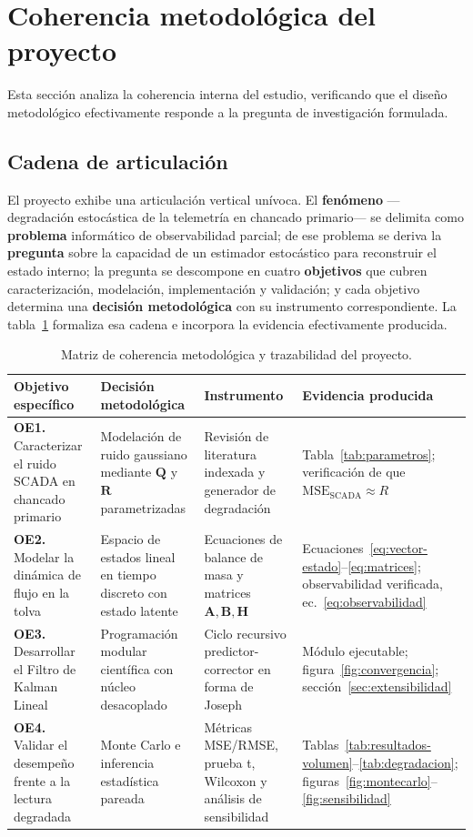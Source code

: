 \section{Coherencia metodológica del proyecto}
\label{sec:coherencia}

Esta sección analiza la coherencia interna del estudio, verificando que el
diseño metodológico efectivamente responde a la pregunta de investigación
formulada.

\subsection{Cadena de articulación}

El proyecto exhibe una articulación vertical unívoca. El \textbf{fenómeno}
—degradación estocástica de la telemetría en chancado primario— se delimita como
\textbf{problema} informático de observabilidad parcial; de ese problema se
deriva la \textbf{pregunta} sobre la capacidad de un estimador estocástico para
reconstruir el estado interno; la pregunta se descompone en cuatro
\textbf{objetivos} que cubren caracterización, modelación, implementación y
validación; y cada objetivo determina una \textbf{decisión metodológica} con su
instrumento correspondiente. La tabla~\ref{tab:coherencia} formaliza esa cadena
e incorpora la evidencia efectivamente producida.

\begin{table}[H]
\centering
\caption{Matriz de coherencia metodológica y trazabilidad del proyecto.}
\label{tab:coherencia}
\footnotesize
\begin{tabular}{@{}p{2.9cm}p{3.2cm}p{3.2cm}p{3.9cm}@{}}
\toprule
\textbf{Objetivo específico} & \textbf{Decisión metodológica} &
\textbf{Instrumento} & \textbf{Evidencia producida}\\
\midrule
\textbf{OE1.} Caracterizar el ruido SCADA en chancado primario &
Modelación de ruido gaussiano mediante $\mathbf{Q}$ y $\mathbf{R}$
parametrizadas &
Revisión de literatura indexada y generador de degradación &
Tabla~\ref{tab:parametros}; verificación de que
$\mathrm{MSE}_{\text{SCADA}} \approx R$\\
\addlinespace
\textbf{OE2.} Modelar la dinámica de flujo en la tolva &
Espacio de estados lineal en tiempo discreto con estado latente &
Ecuaciones de balance de masa y matrices
$\mathbf{A},\mathbf{B},\mathbf{H}$ &
Ecuaciones~\eqref{eq:vector-estado}--\eqref{eq:matrices};
observabilidad verificada, ec.~\eqref{eq:observabilidad}\\
\addlinespace
\textbf{OE3.} Desarrollar el Filtro de Kalman Lineal &
Programación modular científica con núcleo desacoplado &
Ciclo recursivo predictor-corrector en forma de Joseph &
Módulo ejecutable; figura~\ref{fig:convergencia};
sección~\ref{sec:extensibilidad}\\
\addlinespace
\textbf{OE4.} Validar el desempeño frente a la lectura degradada &
Monte Carlo e inferencia estadística pareada &
Métricas MSE/RMSE, prueba t, Wilcoxon y análisis de sensibilidad &
Tablas~\ref{tab:resultados-volumen}--\ref{tab:degradacion};
figuras~\ref{fig:montecarlo}--\ref{fig:sensibilidad}\\
\bottomrule
\end{tabular}
\end{table}

